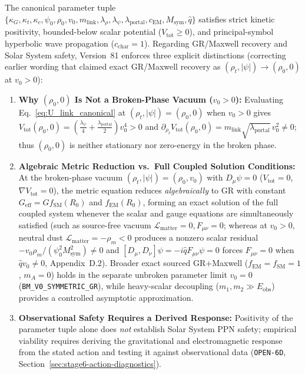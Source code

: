 The canonical parameter tuple $\{\kappa_G, \kappa_t, \kappa_c, \psi_0, \rho_0, v_0, m_{\mathrm{link}}, \lambda_\rho, \lambda_\psi, \lambda_{\mathrm{portal}}, c_{\mathrm{EM}}, M_{\mathrm{sym}}, \hat{q}\}$ satisfies strict kinetic positivity, bounded-below scalar potential ($V_{\mathrm{tot}} \ge 0$), and principal-symbol hyperbolic wave propagation ($c_{\mathrm{char}} = 1$). Regarding GR/Maxwell recovery and Solar System safety, Version~81 enforces three explicit distinctions (correcting earlier wording that claimed exact GR/Maxwell recovery as $(\rho_t, |\psi|) \to (\rho_0, 0)$ at $v_0 > 0$):
\begin{enumerate}[leftmargin=2em]
  \item \textbf{Why $(\rho_0, 0)$ Is Not a Broken-Phase Vacuum ($v_0 > 0$):} Evaluating Eq.~\eqref{eq:U_link_canonical} at $(\rho_t, |\psi|) = (\rho_0, 0)$ when $v_0 > 0$ gives $V_{\mathrm{tot}}(\rho_0, 0) = (\frac{\lambda_\psi}{4} + \frac{\lambda_{\mathrm{portal}}}{2})v_0^4 > 0$ and $\partial_{\rho_t} V_{\mathrm{tot}}(\rho_0, 0) = m_{\mathrm{link}}\sqrt{\lambda_{\mathrm{portal}}}\,v_0^2 \ne 0$; thus $(\rho_0, 0)$ is neither stationary nor zero-energy in the broken phase.
  \item \textbf{Algebraic Metric Reduction vs.\ Full Coupled Solution Conditions:} At the broken-phase vacuum $(\rho_t, |\psi|) = (\rho_0, v_0)$ with $D_\mu\psi = 0$ ($V_{\mathrm{tot}} = 0$, $\nabla V_{\mathrm{tot}} = 0$), the metric equation reduces \emph{algebraically} to GR with constant $G_{\mathrm{eff}} = G f_{\mathrm{SM}}(R_0)$ and $f_{\mathrm{EM}}(R_0)$, forming an exact solution of the full coupled system whenever the scalar and gauge equations are simultaneously satisfied (such as source-free vacuum $\mathcal{L}_{\mathrm{matter}} = 0, F_{\mu\nu} = 0$; whereas at $v_0 > 0$, neutral dust $\mathcal{L}_{\mathrm{matter}} = -\rho_m < 0$ produces a nonzero scalar residual $-v_0\rho_m/(\psi_0^2 M_{\mathrm{sym}}^2) \ne 0$ and $[D_\mu, D_\nu]\psi = -i\hat{q}F_{\mu\nu}\psi = 0$ forces $F_{\mu\nu} = 0$ when $\hat{q}v_0 \ne 0$, Appendix~D.2). Broader exact sourced GR+Maxwell ($f_{\mathrm{EM}} = f_{\mathrm{SM}} = 1$, $m_A = 0$) holds in the separate unbroken parameter limit $v_0 = 0$ (\texttt{BM\_V0\_SYMMETRIC\_GR}), while heavy-scalar decoupling ($m_1, m_2 \gg E_{\mathrm{obs}}$) provides a controlled asymptotic approximation.
  \item \textbf{Observational Safety Requires a Derived Response:} Positivity of the parameter tuple alone does \emph{not} establish Solar System PPN safety; empirical viability requires deriving the gravitational and electromagnetic response from the stated action and testing it against observational data (\texttt{OPEN-6D}, Section~\ref{sec:stage6-action-diagnostics}).
\end{enumerate}

